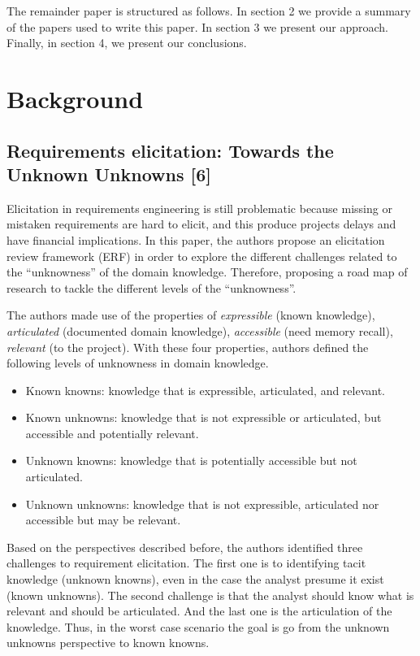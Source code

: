 \documentclass[]{llncs}
\begin{document}
The remainder paper is structured as follows. In section 2 we provide a
summary of the papers used to write this paper. In section 3 we present
our approach. Finally, in section 4, we present our conclusions.

\hypertarget{background}{%
\section{Background}\label{background}}

\hypertarget{requirements-elicitation-towards-the-unknown-unknowns-sutcliffe2013requirements}{%
\subsection{Requirements elicitation: Towards the Unknown Unknowns
{[}6{]}}\label{requirements-elicitation-towards-the-unknown-unknowns-sutcliffe2013requirements}}

Elicitation in requirements engineering is still problematic because
missing or mistaken requirements are hard to elicit, and this produce
projects delays and have financial implications. In this paper, the
authors propose an elicitation review framework (ERF) in order to
explore the different challenges related to the ``unknowness'' of the
domain knowledge. Therefore, proposing a road map of research to tackle
the different levels of the ``unknowness''.

The authors made use of the properties of \emph{expressible} (known
knowledge), \emph{articulated} (documented domain knowledge),
\emph{accessible} (need memory recall), \emph{relevant} (to the
project). With these four properties, authors defined the following
levels of unknowness in domain knowledge.

\begin{itemize}
\tightlist
\item
  Known knowns: knowledge that is expressible, articulated, and
  relevant.
\item
  Known unknowns: knowledge that is not expressible or articulated, but
  accessible and potentially relevant.
\item
  Unknown knowns: knowledge that is potentially accessible but not
  articulated.
\item
  Unknown unknowns: knowledge that is not expressible, articulated nor
  accessible but may be relevant.
\end{itemize}

Based on the perspectives described before, the authors identified three
challenges to requirement elicitation. The first one is to identifying
tacit knowledge (unknown knowns), even in the case the analyst presume
it exist (known unknowns). The second challenge is that the analyst
should know what is relevant and should be articulated. And the last one
is the articulation of the knowledge. Thus, in the worst case scenario
the goal is go from the unknown unknowns perspective to known knowns.
\end{document}
